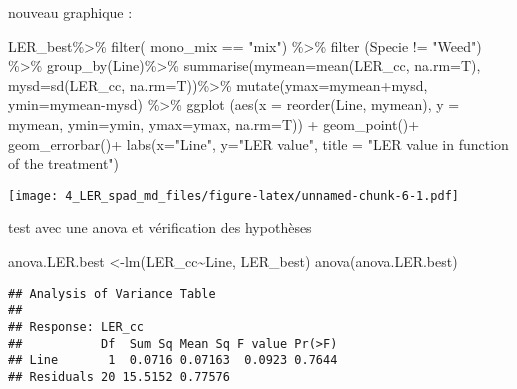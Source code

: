 \documentclass[
]{article}
\newenvironment{Shaded}{\begin{snugshade}}{\end{snugshade}}
\newcommand{\AttributeTok}[1]{\textcolor[rgb]{0.77,0.63,0.00}{#1}}
\newcommand{\FunctionTok}[1]{\textcolor[rgb]{0.00,0.00,0.00}{#1}}
\newcommand{\NormalTok}[1]{#1}
\newcommand{\OtherTok}[1]{\textcolor[rgb]{0.56,0.35,0.01}{#1}}
\newcommand{\SpecialCharTok}[1]{\textcolor[rgb]{0.00,0.00,0.00}{#1}}
\newcommand{\StringTok}[1]{\textcolor[rgb]{0.31,0.60,0.02}{#1}}
\begin{document}
nouveau graphique :

\begin{Shaded}
\begin{Highlighting}[]
\NormalTok{LER\_best}\SpecialCharTok{\%\textgreater{}\%}
  \FunctionTok{filter}\NormalTok{( mono\_mix }\SpecialCharTok{==} \StringTok{"mix"}\NormalTok{) }\SpecialCharTok{\%\textgreater{}\%}
  \FunctionTok{filter}\NormalTok{ (Specie }\SpecialCharTok{!=} \StringTok{"Weed"}\NormalTok{) }\SpecialCharTok{\%\textgreater{}\%}
  \FunctionTok{group\_by}\NormalTok{(Line)}\SpecialCharTok{\%\textgreater{}\%}
  \FunctionTok{summarise}\NormalTok{(}\AttributeTok{mymean=}\FunctionTok{mean}\NormalTok{(LER\_cc, }\AttributeTok{na.rm=}\NormalTok{T),}
            \AttributeTok{mysd=}\FunctionTok{sd}\NormalTok{(LER\_cc, }\AttributeTok{na.rm=}\NormalTok{T))}\SpecialCharTok{\%\textgreater{}\%}
  \FunctionTok{mutate}\NormalTok{(}\AttributeTok{ymax=}\NormalTok{mymean}\SpecialCharTok{+}\NormalTok{mysd, }\AttributeTok{ymin=}\NormalTok{mymean}\SpecialCharTok{{-}}\NormalTok{mysd) }\SpecialCharTok{\%\textgreater{}\%}
  \FunctionTok{ggplot}\NormalTok{ (}\FunctionTok{aes}\NormalTok{(}\AttributeTok{x =} \FunctionTok{reorder}\NormalTok{(Line, mymean), }\AttributeTok{y =}\NormalTok{ mymean,}
              \AttributeTok{ymin=}\NormalTok{ymin, }\AttributeTok{ymax=}\NormalTok{ymax, }\AttributeTok{na.rm=}\NormalTok{T)) }\SpecialCharTok{+} 
  \FunctionTok{geom\_point}\NormalTok{()}\SpecialCharTok{+}
  \FunctionTok{geom\_errorbar}\NormalTok{()}\SpecialCharTok{+}
  \FunctionTok{labs}\NormalTok{(}\AttributeTok{x=}\StringTok{"Line"}\NormalTok{, }\AttributeTok{y=}\StringTok{"LER value"}\NormalTok{, }\AttributeTok{title =} \StringTok{"LER value in function of the treatment"}\NormalTok{)}
\end{Highlighting}
\end{Shaded}

\texttt{[image: 4\_LER\_spad\_md\_files/figure-latex/unnamed-chunk-6-1.pdf]}

test avec une anova et vérification des hypothèses

\begin{Shaded}
\begin{Highlighting}[]
\NormalTok{anova.LER.best }\OtherTok{\textless{}{-}}\FunctionTok{lm}\NormalTok{(LER\_cc}\SpecialCharTok{\textasciitilde{}}\NormalTok{Line, LER\_best)}
\FunctionTok{anova}\NormalTok{(anova.LER.best)}
\end{Highlighting}
\end{Shaded}

\begin{verbatim}
## Analysis of Variance Table
## 
## Response: LER_cc
##           Df  Sum Sq Mean Sq F value Pr(>F)
## Line       1  0.0716 0.07163  0.0923 0.7644
## Residuals 20 15.5152 0.77576
\end{verbatim}
\end{document}
